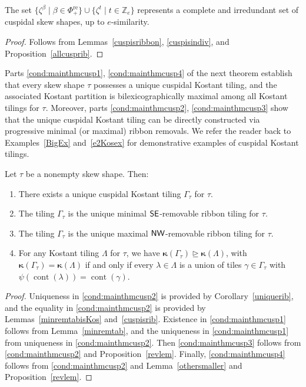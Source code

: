 \documentclass[Unicode,ALCO]{cedram}
\newcommand{\Z}{\mathbb{Z}}
\newcommand{\0}{{\bar 0}}
\newcommand{\nnww}{{\sf NW}}
\newcommand{\ssee}{{\sf SE}}
\newcommand{\bkap}{\boldsymbol{\kappa}}
\def\cont{{\operatorname{cont}}}
\def\re{{\mathrm{re}}}
\begin{document}
\begin{theorem}\label{allcusp}
The set \(\{\zeta^{\beta} \mid \beta \in \Phi_+^\re\} \cup \{\zeta^t \mid t \in \Z_e\}\) represents a complete and irredundant set of cuspidal skew shapes, up to \(e\)-similarity.
\end{theorem}
\begin{proof}
Follows from Lemmas~\ref{cuspisribbon}, \ref{cuspisindiv}, and Proposition~\ref{allcusprib}.
\end{proof}

Parts \eqref{cond:mainthmcusp1}, \eqref{cond:mainthmcusp4} of the next theorem establish that every skew shape \(\tau\) possesses a unique cuspidal Kostant tiling, and the associated Kostant partition is bilexicographically maximal among all Kostant tilings for \(\tau\). Moreover, parts \eqref{cond:mainthmcusp2}, \eqref{cond:mainthmcusp3} show that the unique cuspidal Kostant tiling can be directly constructed via progressive minimal (or maximal) ribbon removals. We refer the reader back to Examples~\ref{BigEx} and~\ref{e2Kosex} for demonstrative examples of cuspidal Kostant tilings.


\begin{theorem}\label{mainthmcusp}
Let \(\tau\) be a nonempty skew shape. Then:
\begin{enumerate}
\item There exists a unique cuspidal Kostant tiling \(\Gamma_\tau\) for \(\tau\). \label{cond:mainthmcusp1}
\item The tiling \(\Gamma_\tau\) is the unique minimal \(\ssee\)-removable ribbon tiling for \(\tau\). \label{cond:mainthmcusp2}
\item The tiling \(\Gamma_\tau\) is the unique maximal \(\nnww\)-removable ribbon tiling for \(\tau\). \label{cond:mainthmcusp3}
\item For any Kostant tiling \(\Lambda\) for \(\tau\), we have \(\bkap(\Gamma_\tau) \trianglerighteq \bkap(\Lambda) \), with \(\bkap(\Gamma_\tau)=\bkap(\Lambda) \) if and only if every \(\lambda \in \Lambda\) is a union of tiles \(\gamma \in \Gamma_\tau\) with \(\psi(\cont(\lambda)) = \cont(\gamma)\). \label{cond:mainthmcusp4}
\end{enumerate}
\end{theorem}
\begin{proof}
Uniqueness in \eqref{cond:mainthmcusp2} is provided by Corollary~\ref{uniquerib}, and the equality in \eqref{cond:mainthmcusp2} is provided by Lemmas~\ref{minremtabisKos} and~\ref{cuspisrib}. Existence in \eqref{cond:mainthmcusp1} follows from Lemma~\ref{minremtab}, and the uniqueness in \eqref{cond:mainthmcusp1} from uniqueness in \eqref{cond:mainthmcusp2}. Then \eqref{cond:mainthmcusp3} follows from \eqref{cond:mainthmcusp2} and Proposition~\ref{revlem}. Finally, \eqref{cond:mainthmcusp4} follows from \eqref{cond:mainthmcusp2} and Lemma~\ref{othersmaller} and Proposition~\ref{revlem}.
\end{proof}
\end{document}
